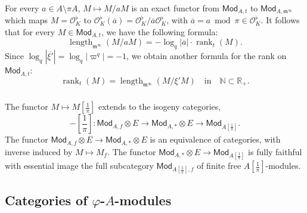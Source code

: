 \documentclass[11pt]{article}
\theoremstyle{definition}
\numberwithin{equation}{section}
\numberwithin{figure}{section}
\numberwithin{table}{section}
\newcommand{\Mod}{\mathsf{Mod}}
\DeclareMathOperator{\length}{length}
\DeclareMathOperator{\rank}{rank}
\begin{document}
\subsubsection{}\label{subsec:relatinglength2rank}

For every $a\in A\setminus\pi A$, $M\mapsto M/aM$ is an exact functor from $\Mod_{A,t}$ to $\Mod_{A,\mathfrak{m}^{\infty}}$ which maps $M=\mathcal{O}_{K}^{\flat}$ to $\mathcal{O}_{K}^{\flat}(\overline{a})=\mathcal{O}_{K}^{\flat}/\overline{a}\mathcal{O}_{K}^{\flat}$, with $\overline{a}=a\bmod\pi\in\mathcal{O}_{K}^{\flat}$. It follows that for every $M\in\Mod_{A,t}$, we have the following formula:
\[
\length_{\mathfrak{m}^{\infty}}\left(M/aM\right)=-\log_{q}\left|\overline{a}\right|\cdot\rank_{t}(M).
\]
Since $\log_{q}\left|\overline{\xi'}\right|=\log_{q}\left|\varpi^{q}\right|=-1$, we obtain another formula for the rank on $\Mod_{A,t}$:
\[
\rank_{t}(M)=\length_{\mathfrak{m}^{\infty}}\left(M/\xi'M\right)\quad\text{in}\quad\mathbb{N}\subset\mathbb{R}_{+}.
\]

\subsubsection{}

The functor $M\mapsto M[\frac{1}{\pi}]$ extends to the isogeny categories,
\[
-\left[\frac{1}{\pi}\right]:\Mod_{A,f}\otimes E\rightarrow\Mod_{A,\ast}\otimes E\rightarrow\Mod_{A[\frac{1}{\pi}]}.
\]
The functor $\Mod_{A,f}\otimes E\rightarrow\Mod_{A,\ast}\otimes E$ is an equivalence of categories, with inverse induced by $M\mapsto M_{f}$. The functor $\Mod_{A,\ast}\otimes E\rightarrow\Mod_{A[\frac{1}{\pi}]}$ is fully faithful with essential image the full subcategory $\Mod_{A[\frac{1}{\pi}],f}$ of finite free $A[\frac{1}{\pi}]$-modules.

\subsection{Categories of \texorpdfstring{$\varphi$}{phi}-\texorpdfstring{$A$}{A}-modules}

\subsubsection{}
\end{document}
